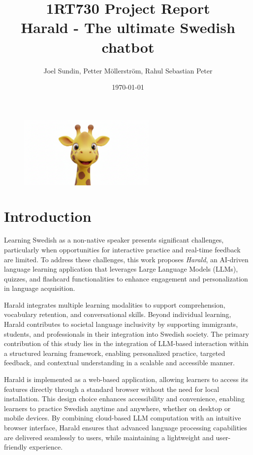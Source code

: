 \documentclass[a4paper,10pt]{article}
\title{\textbf{1RT730 Project Report} 
	\\ Harald - The ultimate Swedish chatbot}
\author{Joel Sundin, Petter Möllerström, Rahul Sebastian Peter}
\date{\today}
\begin{document}
	
\maketitle
\begin{figure}[h!]
    \centering
    \includegraphics[width=0.6\textwidth]{headshot.png}
    \label{fig:harald}
\end{figure}    
\newpage

 \section{Introduction}
Learning Swedish as a non-native speaker presents significant challenges, particularly when opportunities for interactive practice and real-time feedback are limited. To address these challenges, this work proposes \textit{Harald}, an AI-driven language learning application that leverages Large Language Models (LLMs), quizzes, and flashcard functionalities to enhance engagement and personalization in language acquisition.

Harald integrates multiple learning modalities to support comprehension, vocabulary retention, and conversational skills. Beyond individual learning, Harald contributes to societal language inclusivity by supporting immigrants, students, and professionals in their integration into Swedish society. The primary contribution of this study lies in the integration of LLM-based interaction within a structured learning framework, enabling personalized practice, targeted feedback, and contextual understanding in a scalable and accessible manner.

Harald is implemented as a web-based application, allowing learners to access its features directly through a standard browser without the need for local installation. This design choice enhances accessibility and convenience, enabling learners to practice Swedish anytime and anywhere, whether on desktop or mobile devices. By combining cloud-based LLM computation with an intuitive browser interface, Harald ensures that advanced language processing capabilities are delivered seamlessly to users, while maintaining a lightweight and user-friendly experience.
\end{document}
